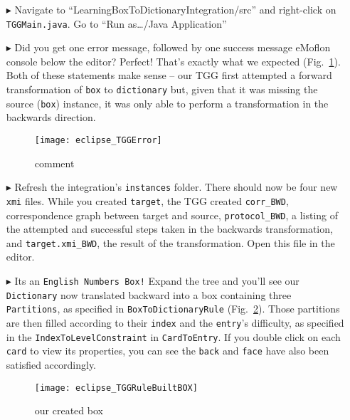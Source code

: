 \begin{itemize}
\item[$\blacktriangleright$] Navigate to ``LearningBox\-To\-Dictionary\-In\-te\-gra\-tion\-/src'' and right-click on \texttt{TGGMain.java}. Go to ``Run
as\ldots/Java Application''

\item[$\blacktriangleright$] Did you get one error message, followed by one success message eMoflon console below the editor? Perfect! That's exactly what we
expected (Fig.~\ref{fig:tggERROR}). Both of these statements make sense -- our TGG first attempted a forward transformation of \texttt{box} to
\texttt{dictionary} but, given that it was missing the source (\texttt{box}) instance, it was only able to perform a transformation in the backwards direction.

\begin{figure}[htbp]
\begin{center}
  \texttt{[image: eclipse\_TGGError]}
  \caption{comment}
  \label{fig:tggERROR}
\end{center}
\end{figure}

\newpage

\item[$\blacktriangleright$] Refresh the integration's \texttt{instances} folder. There should now be four new \texttt{xmi} files. While you created
\texttt{target}, the TGG created \texttt{corr\_BWD}, correspondence graph between target and source, \texttt{protocol\_BWD}, a listing of the attempted
and successful steps taken in the backwards transformation, and \texttt{target.xmi\_BWD}, the result of the transformation. Open this file in the editor.

\item[$\blacktriangleright$] Its an \texttt{English Numbers Box!} Expand the tree and you'll see our \texttt{Dictionary} now translated backward into
a box containing three \texttt{Par\-ti\-tions}, as specified in \texttt{Box\-To\-Dictionary\-Rule} (Fig.~\ref{fig:derivedBOX}). Those partitions are then filled
according to their \texttt{index} and the \texttt{entry}'s difficulty, as specified in the \texttt{IndexToLevelConstraint} in \texttt{CardToEntry}. If you
double click on each \texttt{card} to view its properties, you can see the \texttt{back} and \texttt{face} have also been satisfied accordingly.

\begin{figure}[htbp]
\begin{center}
  \texttt{[image: eclipse\_TGGRuleBuiltBOX]}
  \caption{our created box}
  \label{fig:derivedBOX}
\end{center}
\end{figure}


\end{itemize}
